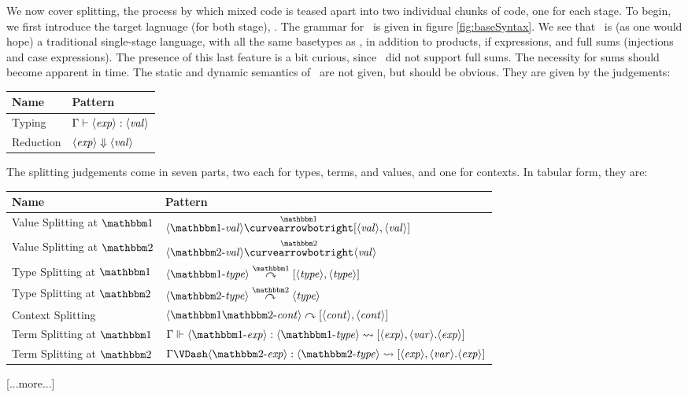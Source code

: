 \documentclass{article}
\begin{document}
We now cover splitting, the process by which mixed code is teased apart into two individual chunks of code, one for each stage.  To begin, we first introduce the target lagnuage (for both stage), \coremono.   The grammar for \coremono~is given in figure \ref{fig:baseSyntax}.  We see that \coremono~is (as one would hope) a traditional single-stage language, with all the same basetypes as \corelang, in addition to products, if expressions, and full sums (injections and case expressions).  The presence of this last feature is a bit curious, since \corelang~did not support full sums.  The necessity for sums should become apparent in time.  The static and dynamic semantics of \coremono~are not given, but should be obvious.  They are given by the judgements:

\begin{center}
\begin{tabular}{|l|l|} \hline
Name & Pattern \\ \hline
Typing & ${\Gamma} \vdash {\langle\mathit{exp}\rangle}:{\langle\mathit{val}\rangle}$ \\  \hline
Reduction & ${\langle\mathit{exp}\rangle} \Downarrow {\langle\mathit{val}\rangle}$ \\ \hline
\end{tabular}
\end{center}

The splitting judgements come in seven parts, two each for types, terms, and values, and one for contexts.  In tabular form, they are:
\begin{center}
\begin{tabular}{|l|l|} \hline
Name & Pattern \\ \hline
Value Splitting at $\bbone$& $\valo \vsplito [\val,\val]$ \\  \hline
Value Splitting at $\bbtwo$& $\valt \vsplits \val$ \\  \hline
Type Splitting at $\bbone$& $\typeo \tsplito [\type,\type]$ \\  \hline
Type Splitting at $\bbtwo$& $\typet \tsplits \type$ \\  \hline
Context Splitting & $\contextot \csplit [\context,\context]$ \\  \hline
Term Splitting at $\bbone$& $\splitone{\expro}{\typeo}{\expr,\var.\expr}$ \\  \hline
Term Splitting at $\bbtwo$& $\splittwo{\exprt}{\typet}{\expr,\var.\expr}$ \\  \hline
\end{tabular}
\end{center}

[...more...]
\end{document}
